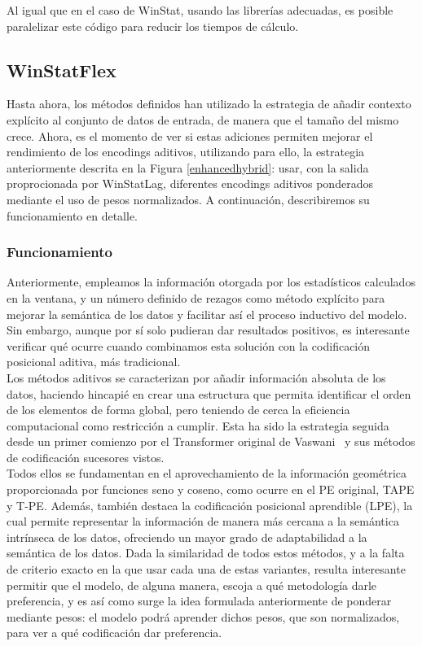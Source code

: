 Al igual que en el caso de WinStat, usando las librerías adecuadas, es posible paralelizar este código para reducir los tiempos de cálculo.

\subsection{WinStatFlex}

Hasta ahora, los métodos definidos han utilizado la estrategia de añadir contexto explícito al conjunto de datos de entrada, de manera que el tamaño del mismo crece. Ahora, es el momento de ver si estas adiciones permiten mejorar el rendimiento de los encodings aditivos, utilizando para ello, la estrategia anteriormente descrita en la Figura \ref{enhancedhybrid}: usar, con la salida proprocionada por WinStatLag, diferentes encodings aditivos ponderados mediante el uso de pesos normalizados. A continuación, describiremos su funcionamiento en detalle.

\subsubsection{Funcionamiento}

Anteriormente, empleamos la información otorgada por los estadísticos calculados en la ventana, y un número definido de rezagos como método explícito para mejorar la semántica de los datos y facilitar así el proceso inductivo del modelo. Sin embargo, aunque por sí solo pudieran dar resultados positivos, es interesante verificar qué ocurre cuando combinamos esta solución con la codificación posicional aditiva, más tradicional.\\

Los métodos aditivos se caracterizan por añadir información absoluta de los datos, haciendo hincapié en crear una estructura que permita identificar el orden de los elementos de forma global, pero teniendo de cerca la eficiencia computacional como restricción a cumplir. Esta ha sido la estrategia seguida desde un primer comienzo por el Transformer original de Vaswani~\cite{vaswani2023attentionneed} y sus métodos de codificación sucesores vistos.\\

Todos ellos se fundamentan en el aprovechamiento de la información geométrica proporcionada por funciones seno y coseno, como ocurre en el PE original, TAPE y T-PE. Además, también destaca la codificación posicional aprendible (LPE), la cual permite representar la información de manera más cercana a la semántica intrínseca de los datos, ofreciendo un mayor grado de adaptabilidad a la semántica de los datos. Dada la similaridad de todos estos métodos, y a la falta de criterio exacto en la que usar cada una de estas variantes, resulta interesante permitir que el modelo, de alguna manera, escoja a qué metodología darle preferencia, y es así como surge la idea formulada anteriormente de ponderar mediante pesos: el modelo podrá aprender dichos pesos, que son normalizados, para ver a qué codificación dar preferencia.\\

